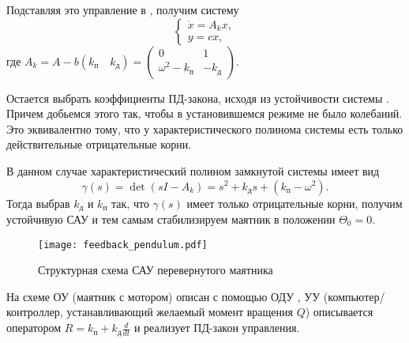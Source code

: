\documentclass[../../TAU.tex]{subfiles}
\begin{document}
    Подставляя это управление в , получим систему
    \begin{equation}\label{EQ2}
    \begin{cases}
    \dot x = A_kx,\\
    y = c x,
    \end{cases}
    \end{equation}
    где $A_k = A - b(k_\text{п}\quad k_\text{д})=\begin{pmatrix}0 & 1\\ \omega^2 - k_\text{п}& - k_\text{д}\end{pmatrix}$.

    Остается выбрать коэффициенты ПД-закона, исходя из устойчивости системы . Причем добьемся этого так, чтобы в установившемся режиме не было колебаний. Это эквивалентно тому, что у характеристического полинома системы  есть только действительные отрицательные корни.

    В данном случае характеристический полином замкнутой системы имеет вид
    $$
    \gamma(s) = \det (sI-A_k) = s^2+ k_\text{д}s+(k_\text{п}-\omega^2).
    $$
    Тогда выбрав $k_\text{д}$ и $k_\text{п}$ так, что $\gamma(s)$ имеет только отрицательные корни, получим устойчивую САУ и тем самым стабилизируем маятник в положении $\Theta_0 = 0$.

    \begin{figure}[h]
    \centering
    \texttt{[image: feedback\_pendulum.pdf]}
    \caption{Структурная схема САУ перевернутого маятника}
    \centering
    \end{figure}


    На схеме ОУ (маятник с мотором) описан с помощью ОДУ , УУ (компьютер/контроллер, устанавливающий желаемый момент вращения $Q$) описывается оператором $R = k_\text{п}+k_\text{д}\frac{d}{dt}$ и реализует ПД-закон управления.
\end{document}
